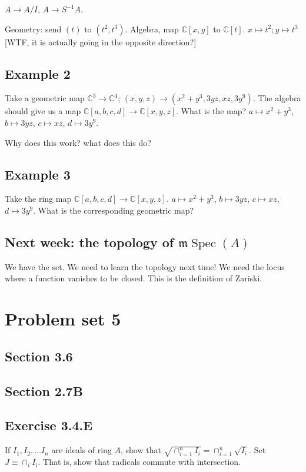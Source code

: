 \documentclass{book}
\newcommand{\C}{\ensuremath{\mathbb{C}}}
\newcommand{\m}{\mathfrak{m}}
\newcommand{\mspec}{\m\operatorname{Spec}}
\theoremstyle{definition}
\begin{document}
$A \rightarrow A/I$, $A \rightarrow S^{-1} A$.

Geometry: send $(t)$ to $(t^2, t^3)$. Algebra, map $\C[x, y]$ to $\C[t]$.
$x \mapsto t^2; y \mapsto t^3$ [WTF, it is actually going in the opposite direction?]

\section{Example 2}
Take a geometric map $\C^3 \rightarrow \C^4$; $(x, y, z) \rightarrow (x^2 + y^3, 3yz, xz, 3y^9)$.
The algebra should give us a map $\C[a, b, c, d] \rightarrow \C[x, y, z]$. What 
is the map? $a \mapsto x^2 + y^3$, $b \mapsto 3yz$, $c \mapsto xz$, $d \mapsto 3y^9$.

Why does this work? what does this do?


\section{Example 3}
Take the ring map 
$\C[a, b, c, d] \rightarrow \C[x, y, z]$. $a \mapsto x^2 + y^3$, $b \mapsto 3yz$, $c \mapsto xz$, $d \mapsto 3y^9$. 
What is the corresponding geometric map?

\section{Next week: the topology of $\mspec(A)$}

We have the set. We need to learn the topology next time! We need the
locus where a function vanishes to be closed. This is the definition of Zariski.

\chapter{Problem set 5}

\section{Section 3.6}
\section{Section 2.7B}
\section{Exercise 3.4.E}
If $I_1, I_2, \dots I_n$ are ideals of ring $A$, show that $\sqrt{\cap_{i=1}^n I_i} = \cap_{i=1}^n \sqrt{I_i}$.
Set $J \equiv \cap_i I_i$.  That is, show that radicals commute with intersection.
\end{document}
